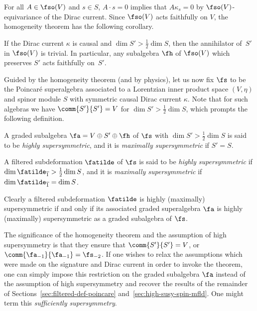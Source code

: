 For all $A\in\fso(V)$ and $s\in S$, $A\cdot s=0$ implies that $A \kappa_s=0$ by $\fso(V)$-equivariance of the Dirac current. Since $\fso(V)$ acts faithfully on $V$, the homogeneity theorem has the following corollary.

\begin{Corollary}\label{coro:homog-faithful}
	If the Dirac current $\kappa$ is causal and $\dim S'>\frac{1}{2}\dim S$, then the annihilator of~$S'$ in $\fso(V)$ is trivial. In particular, any subalgebra $\fh$ of $\fso(V)$ which preserves $S'$ acts faithfully on~$S'$.
\end{Corollary}

Guided by the homogeneity theorem (and by physics), let us now fix $\fs$ to be the Poincar\'e superalgebra associated to a Lorentzian inner product space $(V,\eta)$ and spinor module $S$ with symmetric causal Dirac current $\kappa$. Note that for such algebras we have $\comm{S'}{S'}=V$ for $\dim S'>\frac{1}{2}\dim S$, which prompts the following definition.

\begin{Definition}
	A graded subalgebra $\fa=V\oplus S'\oplus\fh$ of $\fs$ with $\dim S'> \frac{1}{2}\dim S$ is said to be \emph{highly supersymmetric}, and it is \emph{maximally supersymmetric} if $S'=S$.
	
	A filtered subdeformation $\fatilde$ of $\fs$ is said to be \emph{highly supersymmetric} if $\dim \fatilde_{\overline 1}> \frac{1}{2}\dim S$, and it is \emph{maximally supersymmetric} if $\dim \fatilde_{\overline 1} = \dim S$.
\end{Definition}

Clearly a filtered subdeformation $\fatilde$ is highly (maximally) supersymmetric if and only if its associated graded superalgebra $\fa$ is highly (maximally) supersymmetric as a graded subalgebra of $\fs$.

\begin{Remark}\label{rem:relaxing-homogeneity-assumption}
	The significance of the homogeneity theorem and the assumption of high supersymmetry is that they ensure that $\comm{S'}{S'}=V$, or $\comm{\fa_{-1}}{\fa_{-1}}=\fs_{-2}$. If one wishes to relax the assumptions which were made on the signature and Dirac current in order to invoke the theorem, one can simply impose this restriction on the graded subalgebra $\fa$ instead of the assumption of high supersymmetry and recover the results of the remainder of Sections~\ref{sec:filtered-def-poincare} and~\ref{sec:high-susy-spin-mfld}. One might term this \emph{sufficiently supersymmetry}.
\end{Remark}

